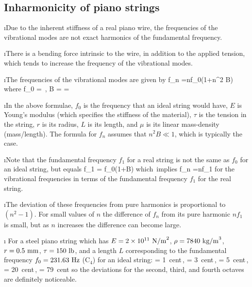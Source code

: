 \ei
\subsection{Inharmonicity of piano strings}
\bi

\i Due to the inherent stiffness of a real piano wire, 
the frequencies of the vibrational modes are not exact 
harmonics of the fundamental frequency.

\i There is a bending force intrinsic to the wire, in addition
to the applied tension, which tends to increase the frequency
of the vibrational modes.

\i The frequencies of the vibrational modes are given by
%
\be
f_n 
=nf_0\left(1+n^2 B\right)
\ee
%
where
%
\be
f_0 = \sqrt{\frac{\tau}{\mu}}\,,
\qquad
B = 
= 
\ee
%

\i In the above formulae, $f_0$ is the frequency that an
ideal string would have,
$E$ is Young's modulus (which specifies the stiffness
of the material), $\tau$ is the tension in the string,
$r$ is its radius, $L$ is its length, and $\mu$ is its 
linear mass-density (mass/length).
The formula for $f_n$ assumes that $n^2 B\ll 1$, 
which is typically the case.

\i Note that the fundamental frequency $f_1$ for a real
string is not the same as $f_0$ for an ideal string, 
but equals
%
\be
f_1 = f_0\left(1+B\right)
\quad
{\rm which\ implies}
\quad
f_n 
=nf_1
\ee
%
for the vibrational frequencies in terms of the
fundamental frequency $f_1$ for the real string.

\i The deviation of these frequencies from 
pure harmonics is proportional to $(n^2-1)$.
For small values of $n$ the difference of $f_n$ from
its pure harmonic $nf_1$ is small, but as 
$n$ increases the difference can become large.

\i \ex
For a steel piano string which has 
$E=2\times 10^{11}~{\rm N/m}^2$, 
$\rho = 7840~{\rm kg/m}^3$, 
$r=0.5~{\rm mm}$, 
$\tau = 150~{\rm lb}$, and a length $L$ corresponding
to the fundamental frequency $f_0= 231.63~{\rm Hz}$ 
(C${}_4$) for an ideal string:
%
\be
{} = 1~{\rm cent}\,,
\quad
{} = 3~{\rm cent}\,,
\quad
{} = 5~{\rm cent}\,,
\quad
{} = 20~{\rm cent}\,,
\quad
{} = 79~{\rm cent}
\ee
%
so the deviations for the second, third, and fourth
octaves are definitely noticeable.

